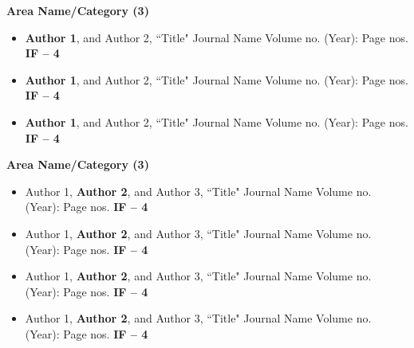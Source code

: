 \documentclass[11pt]{anirudhcv}
\begin{document}
{\color{NextBlue}\textbf{Area Name/Category {\color{NextRed}\textbf{(3)}}}}

\begin{itemize}
	\item {\color{NextRed}\textbf{Author 1}}, and Author 2,  ``Title" Journal Name Volume no. (Year): Page nos. {\color{NextRed}\textbf{IF -- 4}}
\end{itemize}

\begin{itemize}
	\item {\color{NextRed}\textbf{Author 1}}, and Author 2,  ``Title" Journal Name Volume no. (Year): Page nos. {\color{NextRed}\textbf{IF -- 4}}
\end{itemize}

\begin{itemize}
	\item {\color{NextRed}\textbf{Author 1}}, and Author 2,  ``Title" Journal Name Volume no. (Year): Page nos. {\color{NextRed}\textbf{IF -- 4}}
\end{itemize}

{\color{NextBlue}\textbf{Area Name/Category {\color{NextRed}\textbf{(3)}}}}

\begin{itemize}
	\item Author 1, {\color{NextRed}\textbf{Author 2}}, and Author 3,  ``Title" Journal Name Volume no. (Year): Page nos. {\color{NextRed}\textbf{IF -- 4}}
\end{itemize}

\begin{itemize}
	\item Author 1, {\color{NextRed}\textbf{Author 2}}, and Author 3,  ``Title" Journal Name Volume no. (Year): Page nos. {\color{NextRed}\textbf{IF -- 4}}
\end{itemize}

\begin{itemize}
	\item Author 1, {\color{NextRed}\textbf{Author 2}}, and Author 3,  ``Title" Journal Name Volume no. (Year): Page nos. {\color{NextRed}\textbf{IF -- 4}}
\end{itemize}

\begin{itemize}
	\item Author 1, {\color{NextRed}\textbf{Author 2}}, and Author 3,  ``Title" Journal Name Volume no. (Year): Page nos. {\color{NextRed}\textbf{IF -- 4}}
\end{itemize}
\end{document}
